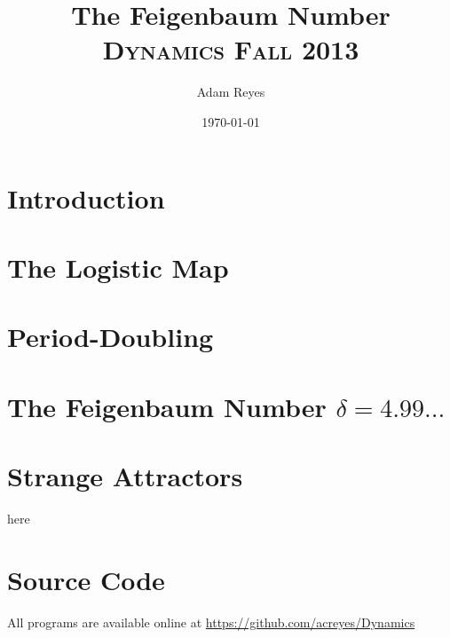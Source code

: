 \documentclass[paper=a4, fontsize=11pt, abstract=on]{scrartcl} %
\title{	
The Feigenbaum Number
\horrule{0.5pt}
\normalfont \normalsize 
\textsc{Dynamics Fall 2013}
}
\author{Adam Reyes} %
\date{\normalsize\today} %
\numberwithin{equation}{section}
\numberwithin{figure}{section}
\numberwithin{table}{section}
\begin{document}
\maketitle

\section{Introduction}
\label{sec:intro}

\section{The Logistic Map}
\label{sec:logmap}

\section{Period-Doubling}
\label{sec:pdub}

\section{The Feigenbaum Number $\delta=4.99...$}
\label{sec:feig}

\section{Strange Attractors}
\label{sec:strng}

here \cite{lorenz}





\section{Source Code}
\label{sec:code}

All programs are available online at
\url{https://github.com/acreyes/Dynamics}






\end{document}
